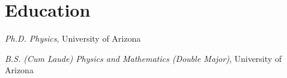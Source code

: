 \section*{Education}

\begin{tlist}

\item[May 2007] \emph{Ph.D. Physics}, University of Arizona

\item[May 2002] \emph{B.S. (Cum Laude) Physics and Mathematics (Double Major)}, University of Arizona

\end{tlist}
